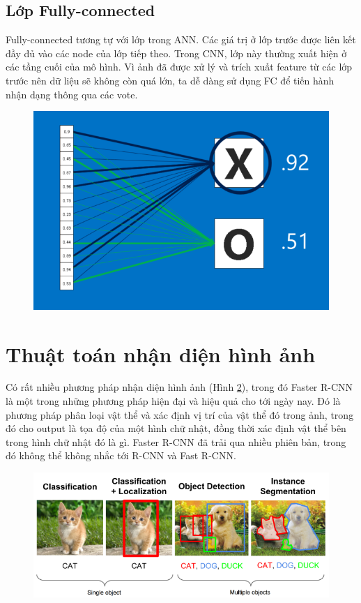 \subsection{Lớp Fully-connected}
Fully-connected tương tự với lớp trong ANN. Các giá trị ở lớp trước được liên kết đầy đủ vào các node của lớp tiếp theo. Trong CNN, lớp này thường xuất hiện ở các tầng cuối của mô hình. Vì ảnh đã được xử lý và trích xuất feature từ các lớp trước nên dữ liệu sẽ không còn quá lớn, ta dễ dàng sử dụng FC để tiến hành nhận dạng thông qua các vote.

\begin{center}
    \begin{figure}[H]
    \centering
    \includegraphics[width=0.5\columnwidth]{images/chap2/fc_vote.png}
    \label{fig:my_label}
    \end{figure}
\end{center}

\section{Thuật toán nhận diện hình ảnh}
Có rất nhiều phương pháp nhận diện hình ảnh (Hình \ref{chap2:object_detection_example}), trong đó Faster R-CNN là một trong những phương pháp hiện đại và hiệu quả cho tới ngày nay. Đó là phương pháp phân loại vật thể và xác định vị trí của vật thể đó trong ảnh, trong đó cho output là tọa độ của một hình chữ nhật, đồng thời xác định vật thể bên trong hình chữ nhật đó là gì. Faster R-CNN đã trải qua nhiều phiên bản, trong đó không thể không nhắc tới R-CNN và Fast R-CNN.

\begin{center}
    \begin{figure}[H]
    \centering
    \includegraphics[width=0.6\columnwidth]{images/chap2/LocalizationDetection.png}
    \label{chap2:object_detection_example}
    \end{figure}
\end{center}
